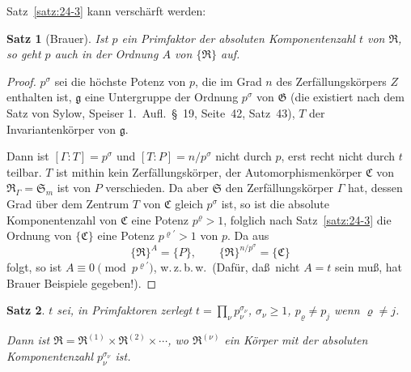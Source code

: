 \documentclass[12pt,a4paper]{article}
\theoremstyle{plain}
\newtheorem{satz}{Satz}[section]
\theoremstyle{definition}
\theoremstyle{remark}
\newcommand{\wzbw}{w.\,z.\,b.\,w.}
\begin{document}
Satz~\ref{satz:24-3} kann versch\"arft werden:

\begin{satz}[Brauer]\label{satz:24-4}
Ist $p$ ein Primfaktor der absoluten Komponentenzahl $t$ von $\mathfrak{R}$, so geht
$p$ auch in der Ordnung $A$ von $\{\mathfrak{R}\}$ auf.
\end{satz}

\begin{proof}
$p^{\sigma}$ sei die h\"ochste Potenz von $p$, die im Grad $n$ des Zerf\"allungsk\"orpers
$Z$ enthalten ist, $\mathfrak{g}$ eine Untergruppe der Ordnung $p^{\sigma}$ von $\mathfrak{G}$ (die
existiert nach dem Satz von Sylow, Speiser 1.\ Aufl.\ \S~19, Seite~42,
Satz~43), $T$ der Invariantenk\"orper von $\mathfrak{g}$.

Dann ist $[\varGamma : T] = p^{\sigma}$ und $[T : P] = n/p^{\sigma}$ nicht durch $p$,
erst recht nicht durch $t$ teilbar. $T$ ist mithin kein Zerf\"allungsk\"orper,
der Automorphismenk\"orper $\mathfrak{C}$ von $\mathfrak{R}_{\varGamma} = \mathfrak{S}_{m}$ ist von $P$ verschieden.
Da aber $\mathfrak{S}$ den Zerf\"allungsk\"orper $\varGamma$ hat, dessen Grad \"uber dem Zentrum
$T$ von $\mathfrak{C}$ gleich $p^{\sigma}$ ist, so ist die absolute Komponentenzahl von
$\mathfrak{C}$ eine Potenz $p^{\varrho} > 1$, folglich nach Satz~\ref{satz:24-3} die Ordnung von
$\{\mathfrak{C}\}$ eine Potenz $p^{\varrho'} > 1$ von $p$. Da aus
\[
\{\mathfrak{R}\}^{A} = \{P\}, \qquad \{\mathfrak{R}\}^{n/p^{\sigma}} = \{\mathfrak{C}\}
\]
folgt, so ist $A \equiv 0 \pmod{p^{\varrho'}}$, \wzbw\ (Daf\"ur, da\ss\ nicht $A = t$
sein mu\ss, hat Brauer Beispiele gegeben!).
\end{proof}

\begin{satz}\label{satz:24-5}
$t$ sei, in Primfaktoren zerlegt $t = \prod_{\nu} p_{\nu}^{\sigma_{\nu}}$,
$\sigma_{\nu} \geq 1$, $p_{\varrho} \neq p_{j}$ wenn $\varrho \neq j$.

Dann ist $\mathfrak{R} = \mathfrak{R}^{(1)} \times \mathfrak{R}^{(2)} \times \cdots$, wo $\mathfrak{R}^{(\nu)}$ ein K\"orper
mit der absoluten Komponentenzahl $p_{\nu}^{\sigma_{\nu}}$ ist.
\end{satz}
\end{document}
